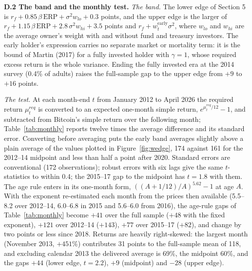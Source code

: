 \documentclass[11pt]{article}
\begin{document}
\textbf{D.2 The band and the monthly test.} \emph{The band.} The lower edge of Section 5 is $r_f + 0.85\,\beta\,\mathrm{ERP} + \sigma^2 w_{lo} + 0.3$ points, and the upper edge is the larger of $r_f + 1.15\,\beta\,\mathrm{ERP} + 2.8\,\sigma^2 w_{hi} + 3.5$ points and $r_f + w^{\text{early}}_t\sigma^2$, where $w_{lo}$ and $w_{hi}$ are the average owner's weight with and without fund and treasury investors. The early holder's expression carries no separate market or mortality term: it is the bound of Martin (2017) for a fully invested holder with $\gamma = 1$, whose required excess return is the whole variance. Ending the fully invested era at the 2014 survey (0.4\% of adults) raises the full-sample gap to the upper edge from $+9$ to $+16$ points.

\emph{The test.} At each month-end $t$ from January 2012 to April 2026 the required return $\mu^{req}_t$ is converted to an expected one-month simple return, $e^{\mu^{req}_t/12} - 1$, and subtracted from Bitcoin's simple return over the following month; Table~\ref{tab:monthly} reports twelve times the average difference and its standard error. Converting before averaging puts the early band averages slightly above a plain average of the values plotted in Figure~\ref{fig:wedge}, 174 against 161 for the 2012--14 midpoint and less than half a point after 2020. Standard errors are conventional (172 observations); robust errors with six lags give the same $t$-statistics to within 0.4; the 2015--17 gap to the midpoint has $t = 1.8$ with them. The age rule enters in its one-month form, $((A + 1/12)/A)^{5.62} - 1$ at age $A$. With the exponent re-estimated each month from the prices then available (5.5--8.2 over 2012--14, 6.0--6.8 in 2015 and 5.6--6.0 from 2016), the age-rule gaps of Table~\ref{tab:monthly} become $+41$ over the full sample ($+48$ with the fixed exponent), $+121$ over 2012--14 ($+143$), $+77$ over 2015--17 ($+82$), and change by two points or less since 2018. Returns are heavily right-skewed: the largest month (November 2013, $+451\%$) contributes 31 points to the full-sample mean of 118, and excluding calendar 2013 the delivered average is 69\%, the midpoint 60\%, and the gaps $+44$ (lower edge, $t = 2.2$), $+9$ (midpoint) and $-28$ (upper edge).
\end{document}
